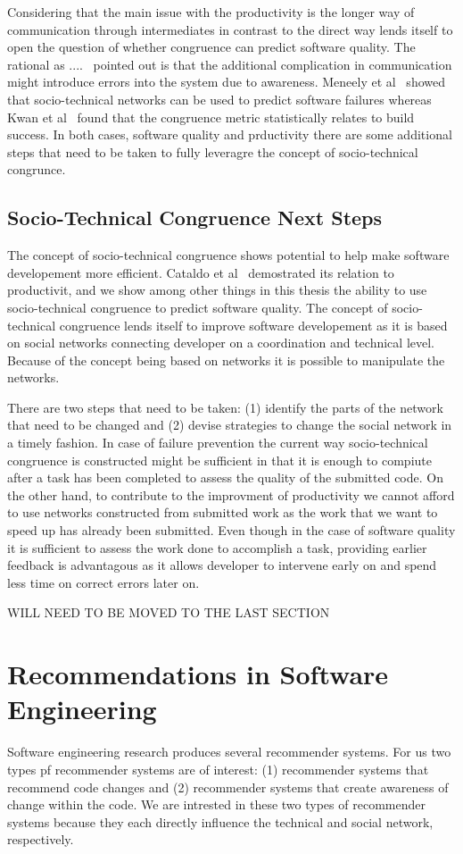 Considering that the main issue with the productivity is the longer way of communication through intermediates in contrast to the direct way lends itself to open the question of whether congruence can predict software quality.
The rational as ....~\cite{} pointed out is that the additional complication in communication might introduce errors into the system due to awareness.
Meneely et al~\cite{} showed that socio-technical networks can be used to predict software failures whereas Kwan et al~\cite{} found that the congruence metric statistically relates to build success.
In both cases, software quality and prductivity there are some additional steps that need to be taken to fully leveragre the concept of socio-technical congrunce.

\subsection{Socio-Technical Congruence Next Steps}
The concept of socio-technical congruence shows potential to help make software developement more efficient.
Cataldo et al~\cite{} demostrated its relation to productivit, and we show among other things in this thesis the ability to use socio-technical congruence to predict software quality.
The concept of socio-technical congruence lends itself to improve software developement as it is based on social networks connecting developer on a coordination and technical level.
Because of the concept being based on networks it is possible to manipulate the networks.

There are two steps that need to be taken:
(1) identify the parts of the network that need to be changed
and (2) devise strategies to change the social network in a timely fashion.
In case of failure prevention the current way socio-technical congruence is constructed might be sufficient in that it is enough to compiute after a task has been completed to assess the quality of the submitted code.
On the other hand, to contribute to the improvment of productivity we cannot afford to use networks constructed from submitted work as the work that we want to speed up has already been submitted.
Even though in the case of software quality it is sufficient to assess the work done to accomplish a task, providing earlier feedback is advantagous as it allows developer to intervene early on and spend less time on correct errors later on.

WILL NEED TO BE MOVED TO THE LAST SECTION

\section{Recommendations in Software Engineering}
Software engineering research produces several recommender systems.
For us two types pf recommender systems are of interest:
(1) recommender systems that recommend code changes
and (2) recommender systems that create awareness of change within the code.
We are intrested in these two types of recommender systems because they each directly influence the technical and social network, respectively.

